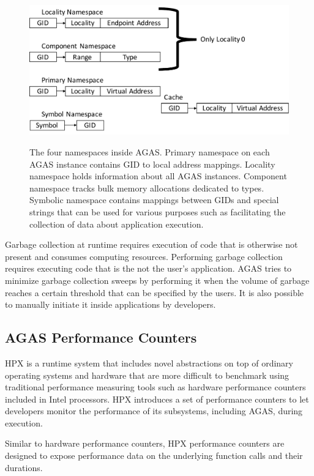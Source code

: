 \begin{figure}[h]
    \centering
    \vspace{2.5cm}
    \caption{The four namespaces inside AGAS. Primary namespace on each AGAS instance contains GID to local address mappings. Locality namespace holds information about all AGAS instances. Component namespace tracks bulk memory allocations dedicated to types. Symbolic namespace contains mappings between GIDs and special strings that can be used for various purposes such as facilitating the collection of data about application execution.}
    \includegraphics[width=.77\textwidth,height=\textheight,keepaspectratio]{illustrations/agas_intern}
    \label{fig:agas_intern}
\end{figure}

Garbage collection at runtime requires execution of code that is otherwise not
present and consumes computing resources. Performing garbage collection
requires executing code that is the not the user's application. AGAS tries to
minimize garbage collection sweeps by performing it when the volume of garbage
reaches a certain threshold that can be specified by the users. It is also
possible to manually initiate it inside applications by developers.

\subsection{AGAS Performance Counters}
HPX is a runtime system that includes novel abstractions on top of ordinary
operating systems and hardware that are more difficult to benchmark using traditional
performance measuring tools such as hardware performance counters included in
Intel processors. HPX introduces a set of performance counters to let
developers monitor the performance of its subsystems, including AGAS, during
execution.

Similar to hardware performance counters, HPX performance counters are designed
to expose performance data on the underlying function calls and their durations.


